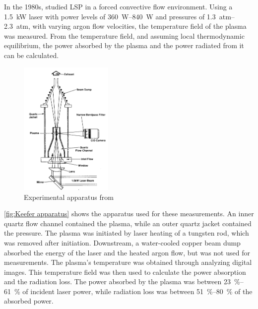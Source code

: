         In the 1980s, \textcite{keeferPowerAbsorptionLasersustained1986a} studied LSP in a forced convective flow environment. Using a \qty{1.5}{kW}  laser with power levels of \qtyrange{360}{840}{W} and pressures of \qtyrange{1.3}{2.3}{atm}, with varying argon flow velocities, the temperature field of the plasma was measured. From the temperature field, and assuming local thermodynamic equilibrium, the power absorbed by the plasma and the power radiated from it can be calculated.
        \begin{figure}[!ht]
            \centering
            \includegraphics[width=0.4\textwidth]{assets/2 background/UTSI (Keefer) Apparatus.png}
            \caption{Experimental apparatus from \textcite{keeferPowerAbsorptionLasersustained1986a}}
            \label{fig:Keefer apparatus}
        \end{figure}
        \autoref{fig:Keefer apparatus} shows the apparatus used for these measurements. An inner quartz flow channel contained the plasma, while an outer quartz jacket contained the pressure. The plasma was initiated by laser heating of a tungsten rod, which was removed after initiation. Downstream, a water-cooled copper beam dump absorbed the energy of the laser and the heated argon flow, but was not used for measurements. The plasma's temperature was obtained through analyzing digital images. This temperature field was then used to calculate the power absorption and the radiation loss. The power absorbed by the plasma was between \qtyrange{23}{61}{\%} of incident laser power, while radiation loss was between \qtyrange{51}{80}{\%} of the absorbed power.

